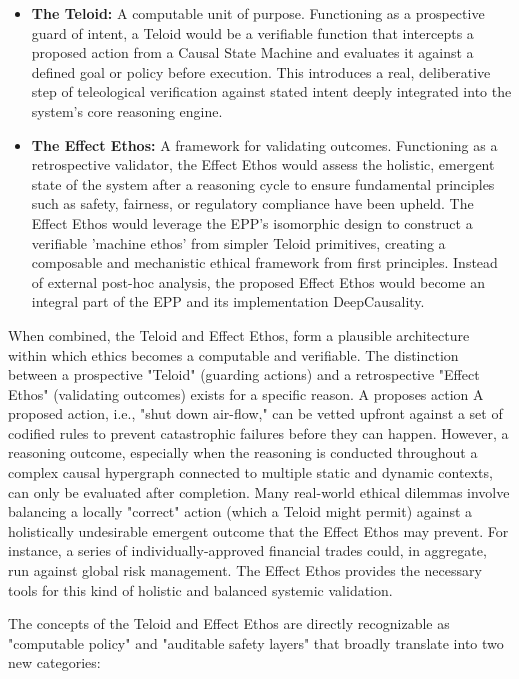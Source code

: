 \begin{itemize}
    \item \textbf{The Teloid:} A computable unit of purpose. Functioning as a prospective guard of intent, a Teloid would be a
  verifiable function that intercepts a proposed action from a Causal State Machine and evaluates it against a defined
  goal or policy before execution. This introduces a real, deliberative step of teleological verification against stated
  intent deeply integrated into the system's core reasoning engine.
    \item \textbf{The Effect Ethos:}  A framework for validating outcomes. Functioning as a retrospective validator, the Effect Ethos
  would assess the holistic, emergent state of the system after a reasoning cycle to ensure fundamental principles such
  as safety, fairness, or regulatory compliance have been upheld. The Effect Ethos would leverage the EPP's isomorphic
  design to construct a verifiable 'machine ethos' from simpler Teloid primitives, creating a composable and mechanistic
  ethical framework from first principles. Instead of external post-hoc analysis, the proposed Effect Ethos would become
  an integral part of the EPP and its implementation DeepCausality.
\end{itemize}

When combined, the Teloid and Effect Ethos, form a plausible architecture within which ethics becomes a computable and
verifiable. The distinction between a prospective "Teloid" (guarding actions) and a retrospective "Effect Ethos"
(validating outcomes) exists for a specific reason. A proposes action A proposed action, i.e., "shut down air-flow,"
can be vetted upfront against a set of codified rules to prevent catastrophic failures before they can happen.
However, a reasoning outcome, especially when the reasoning is conducted throughout a complex causal hypergraph
connected to multiple static and dynamic contexts, can only be evaluated after completion.
Many real-world ethical dilemmas involve balancing a locally "correct" action (which a Teloid might permit) against a
holistically undesirable emergent outcome that the Effect Ethos may prevent. For instance, a series of
individually-approved financial trades could, in aggregate, run against global risk management.
The Effect Ethos provides the necessary tools for this kind of holistic and balanced systemic validation.

The concepts of the Teloid and Effect Ethos are directly recognizable as "computable policy" and "auditable safety
layers" that broadly translate into two new categories:

